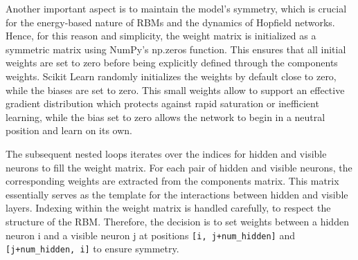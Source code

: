 Another important aspect is to maintain the model's symmetry, which is crucial for the energy-based nature of RBMs and the dynamics of Hopfield networks.
Hence, for this reason and simplicity, the weight matrix is initialized as a symmetric matrix using NumPy's np.zeros function.
This ensures that all initial weights are set to zero before being explicitly defined through the components weights.
Scikit Learn randomly initializes the weights by default close to zero, while the biases are set to zero. 
This small weights allow to support an effective gradient distribution which protects against rapid saturation or inefficient learning,
while the bias set to zero allows the network to begin in a neutral position and learn on its own. 

The subsequent nested loops iterates over the indices for hidden and visible neurons to fill the weight matrix.
For each pair of hidden and visible neurons, the corresponding weights are extracted from the components matrix.
This matrix essentially serves as the template for the interactions between hidden and visible layers.
Indexing within the weight matrix is handled carefully, to respect the structure of the RBM. 
Therefore, the decision is to set weights between a hidden neuron i and a visible neuron j at positions \texttt{[i, j+num\_hidden]} and \texttt{[j+num\_hidden, i]} to ensure symmetry.

